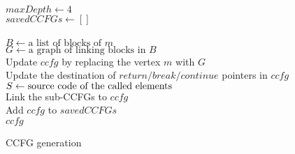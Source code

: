 \begin{algorithm}
\SetAlgoLined
    $maxDepth \leftarrow 4$\label{ccfg_maxDepth}\\
    $savedCCFGs \leftarrow []$\label{ccfg_savedCCFGs}\\
    \BlankLine
     \\
     $B\leftarrow \text{a list of blocks of } m$  \label{ccfg_getBlocks}\\
    $G\leftarrow \text{a graph of linking blocks in } B$ \label{ccfg_linkBlocks}\\
    Update $ccfg$ by replacing the vertex $m$ with $G$ \label{ccfg_updateCCFG}\\
    {
        Update the destination of $return/break/continue$ pointers in $ccfg$ \label{ccfg_updatePoiter}
    }
    {
        $S\leftarrow \textnormal{source code of the called elements}$ \label{ccfg_getCallee} \\
        {
             \label{ccfg_generateCallee}
        } 
        Link the sub-CCFGs to $ccfg$ \label{ccfg_linkSub}\\
    }
    Add $ccfg$ to $savedCCFGs$\label{ccfg_saveForReuse}\\ 
     \Return $ccfg$
    \caption{CCFG generation}
    \label{algorithm_generate_ccfg}
\end{algorithm}